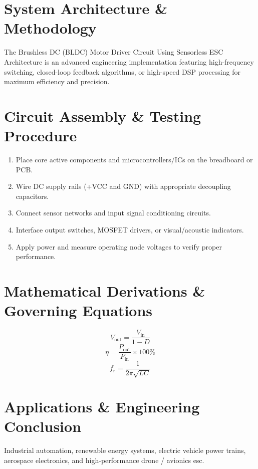 \documentclass[11pt,a4paper]{article}
\begin{document}
\section{System Architecture \& Methodology}
The Brushless DC (BLDC) Motor Driver Circuit Using Sensorless ESC Architecture is an advanced engineering implementation featuring high-frequency switching, closed-loop feedback algorithms, or high-speed DSP processing for maximum efficiency and precision.

\section{Circuit Assembly \& Testing Procedure}
\begin{enumerate}
    \item Place core active components and microcontrollers/ICs on the breadboard or PCB.
    \item Wire DC supply rails (+VCC and GND) with appropriate decoupling capacitors.
    \item Connect sensor networks and input signal conditioning circuits.
    \item Interface output switches, MOSFET drivers, or visual/acoustic indicators.
    \item Apply power and measure operating node voltages to verify proper performance.
\end{enumerate}

\section{Mathematical Derivations \& Governing Equations}
\begin{equation}
V_{\text{out}} = \frac{V_{\text{in}}}{1 - D}
\end{equation}
\begin{equation}
\eta = \frac{P_{\text{out}}}{P_{\text{in}}} \times 100\%
\end{equation}
\begin{equation}
f_r = \frac{1}{2\pi \sqrt{L C}}
\end{equation}

\section{Applications \& Engineering Conclusion}
Industrial automation, renewable energy systems, electric vehicle power trains, aerospace electronics, and high-performance drone / avionics esc.
\end{document}
